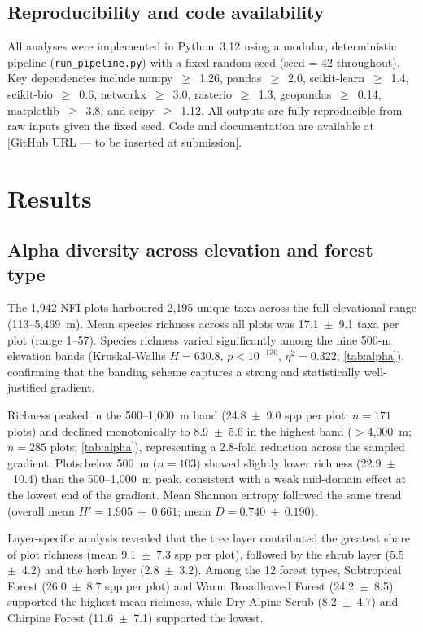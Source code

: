 \documentclass[review,12pt,a4paper]{elsarticle}
\begin{document}
\subsection{Reproducibility and code availability}
\label{sec:reproducibility}

All analyses were implemented in Python~3.12 using a modular, deterministic
pipeline (\texttt{run\_pipeline.py}) with a fixed random seed (seed = 42
throughout). Key dependencies include numpy~$\geq$~1.26, pandas~$\geq$~2.0,
scikit-learn~$\geq$~1.4, scikit-bio~$\geq$~0.6, networkx~$\geq$~3.0,
rasterio~$\geq$~1.3, geopandas~$\geq$~0.14, matplotlib~$\geq$~3.8, and
scipy~$\geq$~1.12. All outputs are fully reproducible from raw inputs given
the fixed seed. Code and documentation are available at [GitHub URL --- to be
inserted at submission].

\section{Results}
\label{sec:results}

\subsection{Alpha diversity across elevation and forest type}
\label{sec:res_alpha}

The 1{,}942 NFI plots harboured 2{,}195 unique taxa across the full
elevational range (113--5{,}469~m). Mean species richness across all plots
was 17.1~$\pm$~9.1 taxa per plot (range 1--57). Species richness varied
significantly among the nine 500-m elevation bands
(Kruskal-Wallis $H = 630.8$, $p < 10^{-130}$, $\eta^2 = 0.322$;
\cref{tab:alpha}), confirming that the banding scheme captures a strong and
statistically well-justified gradient.

Richness peaked in the 500--1{,}000~m band
(24.8~$\pm$~9.0 spp per plot; $n = 171$ plots) and declined monotonically to
8.9~$\pm$~5.6 in the highest band ($>$4{,}000~m; $n = 285$ plots;
\cref{tab:alpha}), representing a 2.8-fold reduction across the sampled
gradient. Plots below 500~m ($n = 103$) showed slightly lower richness
(22.9~$\pm$~10.4) than the 500--1{,}000~m peak, consistent with a weak
mid-domain effect at the lowest end of the gradient. Mean Shannon entropy
followed the same trend (overall mean $H' = 1.905~\pm~0.661$; mean
$D = 0.740~\pm~0.190$).

Layer-specific analysis revealed that the tree layer contributed the greatest
share of plot richness (mean 9.1~$\pm$~7.3 spp per plot), followed by the
shrub layer (5.5~$\pm$~4.2) and the herb layer (2.8~$\pm$~3.2). Among the
12 forest types, Subtropical Forest (26.0~$\pm$~8.7 spp per plot) and Warm
Broadleaved Forest (24.2~$\pm$~8.5) supported the highest mean richness, while
Dry Alpine Scrub (8.2~$\pm$~4.7) and Chirpine Forest (11.6~$\pm$~7.1)
supported the lowest.
\end{document}
